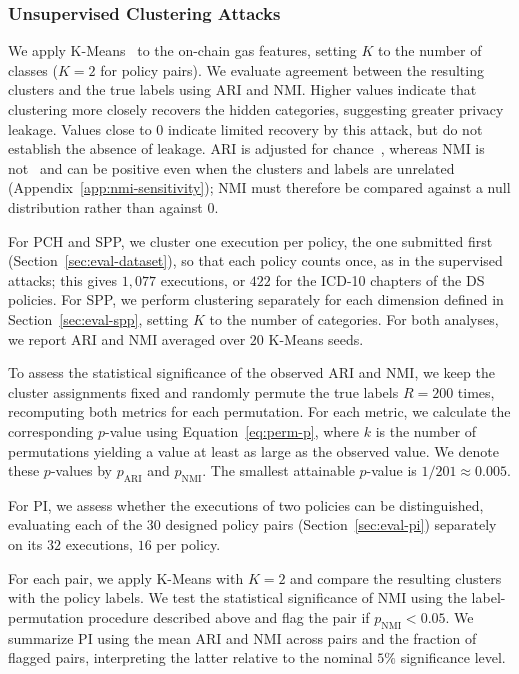 \subsubsection{Unsupervised Clustering Attacks}
We apply K-Means~\cite{lloyd1982least} to the on-chain gas features, setting $K$ to the number of classes ($K=2$ for policy pairs).
We evaluate agreement between the resulting clusters and the true labels using ARI and NMI.
Higher values indicate that clustering more closely recovers the hidden categories, suggesting greater privacy leakage.
Values close to $0$ indicate limited recovery by this attack, but do not establish the absence of leakage.
ARI is adjusted for chance~\cite{hubert1985comparing}, whereas NMI is not~\cite{vinh2010information} and can be positive even when the clusters and labels are unrelated (Appendix~\ref{app:nmi-sensitivity}); NMI must therefore be compared against a null distribution rather than against $0$.

For PCH and SPP, we cluster one execution per policy, the one submitted first (Section~\ref{sec:eval-dataset}), so that each policy counts once, as in the supervised attacks; this gives $1{,}077$ executions, or $422$ for the ICD-10 chapters of the DS policies.
For SPP, we perform clustering separately for each dimension defined in Section~\ref{sec:eval-spp}, setting $K$ to the number of categories.
For both analyses, we report ARI and NMI averaged over $20$ K-Means seeds.

To assess the statistical significance of the observed ARI and NMI, we keep the cluster assignments fixed and randomly permute the true labels $R=200$ times, recomputing both metrics for each permutation.
For each metric, we calculate the corresponding $p$-value using Equation~\eqref{eq:perm-p}, where $k$ is the number of permutations yielding a value at least as large as the observed value.
We denote these $p$-values by $p_{\mathrm{ARI}}$ and $p_{\mathrm{NMI}}$.
The smallest attainable $p$-value is $1/201 \approx 0.005$.

For PI, we assess whether the executions of two policies can be distinguished, evaluating each of the $30$ designed policy pairs (Section~\ref{sec:eval-pi}) separately on its $32$ executions, $16$ per policy.

For each pair, we apply K-Means with $K=2$ and compare the resulting clusters with the policy labels.
We test the statistical significance of NMI using the label-permutation procedure described above and flag the pair if $p_{\mathrm{NMI}}<0.05$.
We summarize PI using the mean ARI and NMI across pairs and the fraction of flagged pairs, interpreting the latter relative to the nominal $5\%$ significance level.

